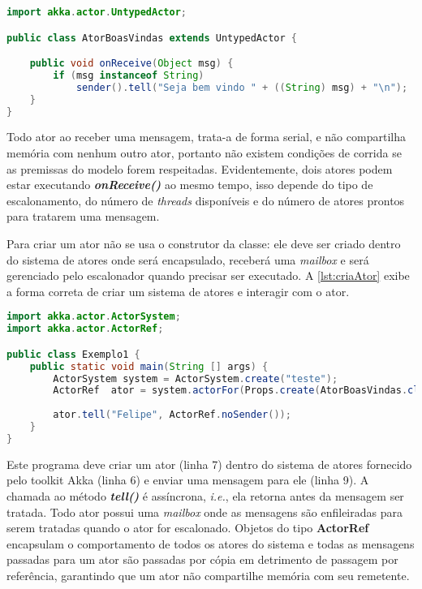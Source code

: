 \begin{lstlisting}[language=Java,label={lst:akkaActor}, caption={Classe que define o comportamento de um ator}]
import akka.actor.UntypedActor;

public class AtorBoasVindas extends UntypedActor {

    public void onReceive(Object msg) {
        if (msg instanceof String)     
            sender().tell("Seja bem vindo " + ((String) msg) + "\n");
    }
}
\end{lstlisting}

Todo ator ao receber uma mensagem, trata-a de forma serial, e não compartilha memória com nenhum outro ator, portanto não existem condições de corrida se as premissas do modelo forem respeitadas. Evidentemente, dois atores podem estar executando \textit{\textbf{onReceive()}} ao mesmo tempo, isso depende do tipo de escalonamento, do número de \textit{threads} disponíveis e do número de atores prontos para tratarem uma mensagem. 

Para criar um ator não se usa o construtor da classe: ele deve ser criado dentro do sistema de atores onde será encapsulado, receberá uma \textit{mailbox} e será gerenciado pelo escalonador quando precisar ser executado. A \autoref{lst:criaAtor} exibe a forma correta de criar um sistema de atores  e interagir com o ator.

\begin{lstlisting}[language=Java,label={lst:criaAtor}, caption={Programa principal que cria um sistema de atores e instancia um ator}]
import akka.actor.ActorSystem;
import akka.actor.ActorRef;

public class Exemplo1 {
    public static void main(String [] args) {
        ActorSystem system = ActorSystem.create("teste");
        ActorRef  ator = system.actorFor(Props.create(AtorBoasVindas.class),"boasVindas");
        
        ator.tell("Felipe", ActorRef.noSender());
    }
}

\end{lstlisting}

Este programa deve criar um ator (linha 7) dentro do sistema de atores fornecido pelo toolkit Akka (linha 6) e enviar uma mensagem para ele (linha 9). A chamada ao método \textit{\textbf{tell()}} é assíncrona, \textit{i.e.}, ela retorna antes da mensagem ser tratada. Todo ator possui uma \textit{mailbox} onde as mensagens são enfileiradas para serem tratadas quando o ator for escalonado. Objetos do tipo \textbf{ActorRef} encapsulam o comportamento de todos os atores do sistema e todas as mensagens passadas para um ator são passadas por cópia em detrimento de passagem por referência, garantindo que um ator não compartilhe memória com seu remetente. 

